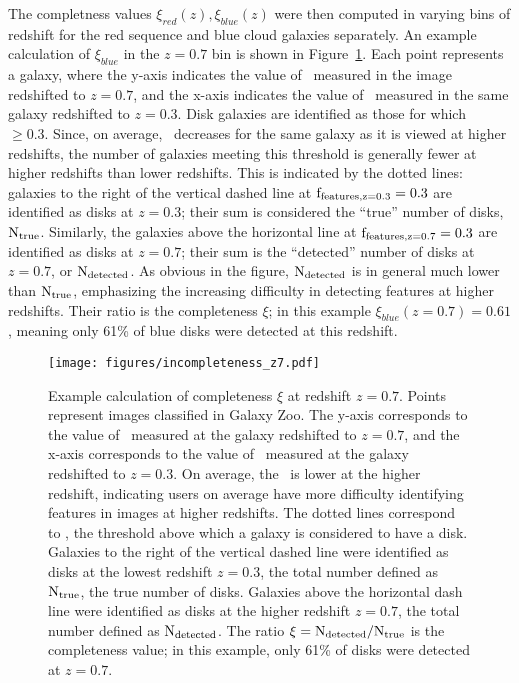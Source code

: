 The completness values $\xi_{red}(z),\xi_{blue}(z)$ were then computed in varying bins of redshift for the red sequence and blue cloud galaxies separately. An example calculation of $\xi_{blue}$ in the $z=0.7$ bin is shown in Figure~\ref{fig:inc_subplot}. Each point represents a  galaxy, where the y-axis indicates the value of \ffeatures~measured in the image redshifted to $z=0.7$, and the x-axis indicates the value of \ffeatures~measured in the same galaxy redshifted to $z=0.3$. Disk galaxies are identified as those for which \ffeatures~$\ge0.3$. Since, on average, \ffeatures~decreases for the same galaxy as it is viewed at higher redshifts, the number of galaxies meeting this threshold is generally fewer at higher redshifts than lower redshifts. This is indicated by the dotted lines: galaxies to the right of the vertical dashed line at $\rm f_{features,z=0.3}=0.3$ are identified as disks at $z=0.3$; their sum is considered the ``true'' number of disks, $\rm N_{true}$. Similarly, the galaxies above the horizontal line at $\rm f_{features,z=0.7}=0.3$ are identified as disks at $z=0.7$; their sum is the ``detected'' number of disks at $z=0.7$, or $\rm N_{detected}$. As obvious in the figure, $\rm N_{detected}$ is in general much lower than $\rm N_{true}$, emphasizing the increasing difficulty in detecting features at higher redshifts. Their ratio is the completeness $\xi$; in this example $\xi_{blue}(z=0.7)=0.61$, meaning only 61\% of blue disks were detected at this redshift. 

\begin{figure}
\centering
\texttt{[image: figures/incompleteness\_z7.pdf]}
\caption{Example calculation of completeness $\xi$ at redshift $z=0.7$. Points represent  images classified in Galaxy Zoo. The y-axis corresponds to the value of \ffeatures~measured at the galaxy redshifted to $z=0.7$, and the x-axis corresponds to the value of \ffeatures~measured at the galaxy redshifted to $z=0.3$. On average, the \ffeatures~is lower at the higher redshift, indicating users on average have more difficulty identifying features in images at higher redshifts. The dotted lines correspond to , the threshold above which a galaxy is considered to have a disk. Galaxies to the right of the vertical dashed line were identified as disks at the lowest redshift $z=0.3$, the total number defined as $\rm N_{true}$, the true number of disks. Galaxies above the horizontal dash line were identified as disks at the higher redshift $z=0.7$, the total number defined as $\rm N_{detected}$. The ratio $\rm \xi=N_{detected}/N_{true}$ is the completeness value; in this example, only 61\% of disks were detected at $z=0.7$.}
\label{fig:inc_subplot}
\end{figure}

